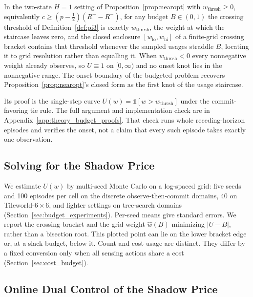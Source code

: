 \begin{corollary}
\label{cor:pi4}
In the two-state $H{=}1$ setting of Proposition~\ref{prop:nearopt} with $w_{\mathrm{thresh}} \geq 0$, equivalently $c \geq (p - \tfrac{1}{2})(R^+ - R^-)$, for any budget $B \in (0,1)$ the crossing threshold of Definition~\ref{def:pi3} is exactly $w_{\mathrm{thresh}}$, the weight at which the staircase leaves zero, and the closed enclosure $[w_{\mathrm{lo}}, w_{\mathrm{hi}}]$ of a finite-grid crossing bracket contains that threshold whenever the sampled usages straddle $B$, locating it to grid resolution rather than equalling it. When $w_{\mathrm{thresh}} < 0$ every nonnegative weight already observes, so $U \equiv 1$ on $[0,\infty)$ and no onset knot lies in the nonnegative range. The onset boundary of the budgeted problem recovers Proposition~\ref{prop:nearopt}'s closed form as the first knot of the usage staircase.
\end{corollary}

Its proof is the single-step curve $U(w)=\mathbb 1[w>w_{\mathrm{thresh}}]$ under the commit-favoring tie rule. The full argument and implementation check are in Appendix~\ref{app:theory_budget_proofs}. That check runs whole receding-horizon episodes and verifies the onset, not a claim that every such episode takes exactly one observation.

\subsection{Solving for the Shadow Price}
\label{sec:budget_solve}

We estimate $U(w)$ by multi-seed Monte Carlo on a log-spaced grid: five seeds and 100 episodes per cell on the discrete observe-then-commit domains, 40 on Tileworld-$6\times6$, and lighter settings on tree-search domains (Section~\ref{sec:budget_experiments}). Per-seed means give standard errors. We report the crossing bracket and the grid weight $\hat w(B)$ minimizing $|U-B|$, rather than a bisection root. This plotted point can lie on the lower bracket edge or, at a slack budget, below it. Count and cost usage are distinct. They differ by a fixed conversion only when all sensing actions share a cost (Section~\ref{sec:cost_budget}).

\subsection{Online Dual Control of the Shadow Price}
\label{sec:pi5}

